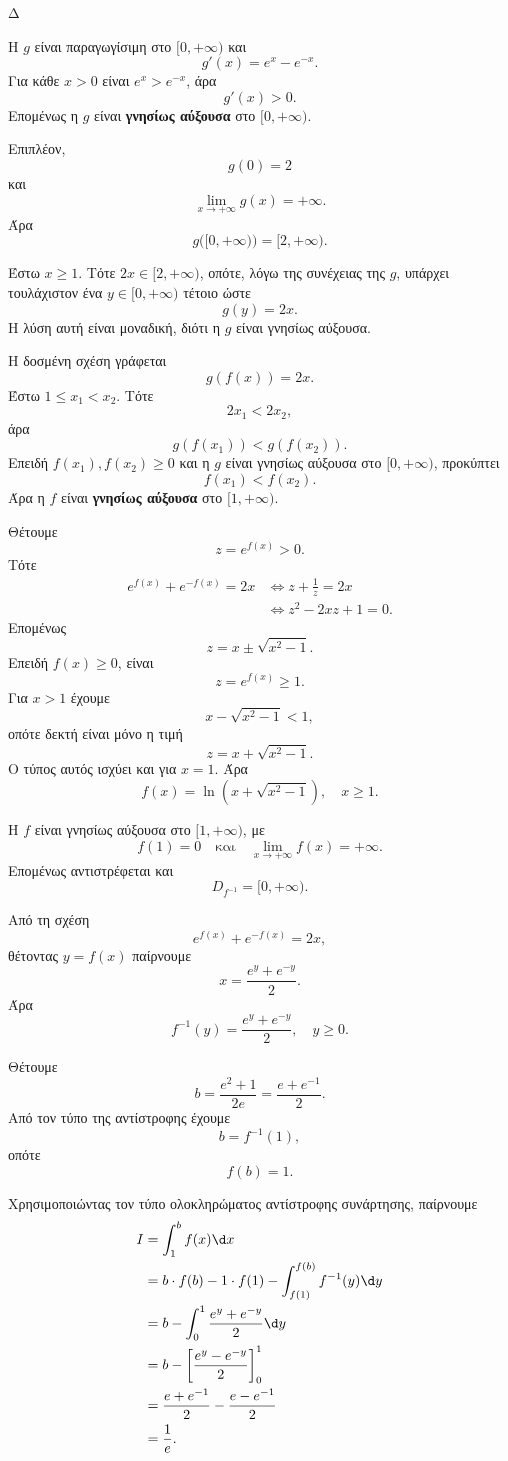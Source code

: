 \begin{thema}{Δ}
\begin{erwthma}
\item Η $g$ είναι παραγωγίσιμη στο $[0,+\infty)$ και
\[
g'(x)=e^x-e^{-x}.
\]
Για κάθε $x>0$ είναι $e^x>e^{-x}$, άρα
\[
g'(x)>0.
\]
Επομένως η $g$ είναι \textbf{γνησίως αύξουσα} στο $[0,+\infty)$.

Επιπλέον,
\[
g(0)=2
\]
και
\[
\lim_{x\to+\infty}g(x)=+\infty.
\]
Άρα
\[
g\big([0,+\infty)\big)=[2,+\infty).
\]

Έστω $x\geq1$. Τότε $2x\in[2,+\infty)$, οπότε, λόγω της συνέχειας της $g$, υπάρχει τουλάχιστον ένα $y\in[0,+\infty)$ τέτοιο ώστε
\[
g(y)=2x.
\]
Η λύση αυτή είναι μοναδική, διότι η $g$ είναι γνησίως αύξουσα.

\item Η δοσμένη σχέση γράφεται
\[
g(f(x))=2x.
\]
Έστω $1\leq x_1<x_2$. Τότε
\[
2x_1<2x_2,
\]
άρα
\[
g(f(x_1))<g(f(x_2)).
\]
Επειδή $f(x_1),f(x_2)\geq0$ και η $g$ είναι γνησίως αύξουσα στο $[0,+\infty)$, προκύπτει
\[
f(x_1)<f(x_2).
\]
Άρα η $f$ είναι \textbf{γνησίως αύξουσα} στο $[1,+\infty)$.

\item Θέτουμε
\[
z=e^{f(x)}>0.
\]
Τότε
\begin{align*}
e^{f(x)}+e^{-f(x)}=2x
&\Leftrightarrow
z+\frac{1}{z}=2x\\
&\Leftrightarrow
z^2-2xz+1=0.
\end{align*}
Επομένως
\[
z=x\pm\sqrt{x^2-1}.
\]
Επειδή $f(x)\geq0$, είναι
\[
z=e^{f(x)}\geq1.
\]
Για $x>1$ έχουμε
\[
x-\sqrt{x^2-1}<1,
\]
οπότε δεκτή είναι μόνο η τιμή
\[
z=x+\sqrt{x^2-1}.
\]
Ο τύπος αυτός ισχύει και για $x=1$. Άρα
\[
{
f(x)=\ln\left(x+\sqrt{x^2-1}\right)},\quad x\geq1.
\]

Η $f$ είναι γνησίως αύξουσα στο $[1,+\infty)$, με
\[
f(1)=0
\quad\text{και}\quad
\lim_{x\to+\infty}f(x)=+\infty.
\]
Επομένως αντιστρέφεται και
\[
D_{f^{-1}}=[0,+\infty).
\]

Από τη σχέση
\[
e^{f(x)}+e^{-f(x)}=2x,
\]
θέτοντας $y=f(x)$ παίρνουμε
\[
x=\frac{e^y+e^{-y}}{2}.
\]
Άρα
\[
{
f^{-1}(y)=\frac{e^y+e^{-y}}{2}},\quad y\geq0.
\]

\item Θέτουμε
\[
b=\frac{e^2+1}{2e}
=\frac{e+e^{-1}}{2}.
\]
Από τον τύπο της αντίστροφης έχουμε
\[
b=f^{-1}(1),
\]
οπότε
\[
f(b)=1.
\]

Χρησιμοποιώντας τον τύπο ολοκληρώματος αντίστροφης συνάρτησης, παίρνουμε
\begin{align*}
I
&=\int_1^b f(x)\d x\\
&=b\cdot f(b)-1\cdot f(1)
-\int_{f(1)}^{f(b)}f^{-1}(y)\d y\\
&=b-\int_0^1\frac{e^y+e^{-y}}{2}\d y\\
&=b-\left[\frac{e^y-e^{-y}}{2}\right]_0^1\\
&=\frac{e+e^{-1}}{2}
-\frac{e-e^{-1}}{2}\\
&={\frac{1}{e}}.
\end{align*}
\end{erwthma}
\end{thema}

